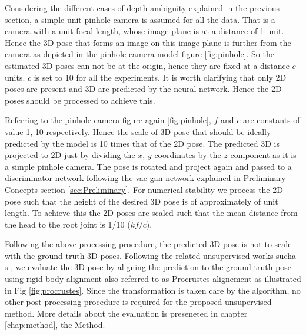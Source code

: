 Considering the different cases of depth ambiguity explained in the previous section, a simple unit pinhole camera is assumed for all the data. That is a camera with a unit focal length, whose image plane is at a distance of 1 unit. Hence the 3D pose that forms an image on this image plane is further from the camera as depicted in the pinhole camera model figure \ref{fig:pinhole}. So the estimated 3D poses can not be at the origin, hence they are fixed at a distance $c$ units. $c$ is set to 10 for all the experiments. It is worth clarifying that only 2D poses are present and 3D are predicted by the neural network. Hence the 2D poses should be processed to achieve this. 

Referring to the pinhole camera figure again \ref{fig:pinhole}, $f$ and $c$ are constants of value 1, 10 respectively. Hence the scale of 3D pose that should be ideally predicted by the model is 10 times that of the 2D pose. The predicted 3D is projected to 2D just by dividing the $x$, $y$ coordinates by the $z$ component as it is a simple pinhole camera. The pose is rotated and project again and passed to a discriminator network following the \ac{vae}-\ac{gan} network explained in Preliminary Concepts section \ref{sec:Preliminary}. For numerical stability we process the 2D pose such that the height of the desired 3D pose is of approximately of unit length. To achieve this the 2D poses are scaled such that the mean distance from the head to the root joint is 1/10 ($k f/c$). 

Following the above processing procedure, the predicted 3D pose is not to scale with the ground truth 3D poses. Following the related unsupervised works sucha s \cite{amazon1}, we evaluate the 3D pose by aligning the prediction to the ground truth pose using rigid body alignment also referred to as Procrustes alignement as illustrated in Fig \ref{fig:procrustes}. Since the transformation is taken care by the algorithm, no other post-processing procedure is required for the proposed unsupervised method. More details about the evaluation is preseneted in chapter \ref{chap:method}, the Method.



